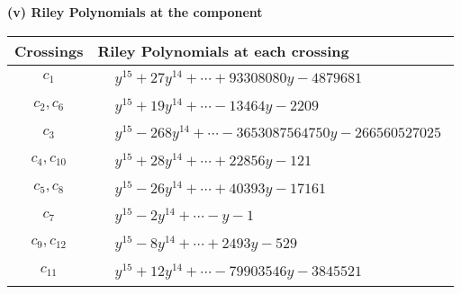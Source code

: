 \documentclass[1p]{elsarticle_modified}
\theoremstyle{definition}
\begin{document}
\newpage\renewcommand{\arraystretch}{1}
\flushleft \textbf{(v) Riley Polynomials at the component}\newline \\
\begin{tabular}{m{50pt}|m{274pt}}
Crossings & \hspace{64pt}Riley Polynomials at each crossing \\
\hline $$\begin{aligned}c_{1}\end{aligned}$$&$\begin{aligned}
&y^{15}+27 y^{14}+\cdots+93308080 y-4879681
\end{aligned}$\\
\hline $$\begin{aligned}c_{2},c_{6}\end{aligned}$$&$\begin{aligned}
&y^{15}+19 y^{14}+\cdots-13464 y-2209
\end{aligned}$\\
\hline $$\begin{aligned}c_{3}\end{aligned}$$&$\begin{aligned}
&y^{15}-268 y^{14}+\cdots-3653087564750 y-266560527025
\end{aligned}$\\
\hline $$\begin{aligned}c_{4},c_{10}\end{aligned}$$&$\begin{aligned}
&y^{15}+28 y^{14}+\cdots+22856 y-121
\end{aligned}$\\
\hline $$\begin{aligned}c_{5},c_{8}\end{aligned}$$&$\begin{aligned}
&y^{15}-26 y^{14}+\cdots+40393 y-17161
\end{aligned}$\\
\hline $$\begin{aligned}c_{7}\end{aligned}$$&$\begin{aligned}
&y^{15}-2 y^{14}+\cdots- y-1
\end{aligned}$\\
\hline $$\begin{aligned}c_{9},c_{12}\end{aligned}$$&$\begin{aligned}
&y^{15}-8 y^{14}+\cdots+2493 y-529
\end{aligned}$\\
\hline $$\begin{aligned}c_{11}\end{aligned}$$&$\begin{aligned}
&y^{15}+12 y^{14}+\cdots-79903546 y-3845521
\end{aligned}$\\
\hline
\end{tabular}\\~\\
\end{document}
